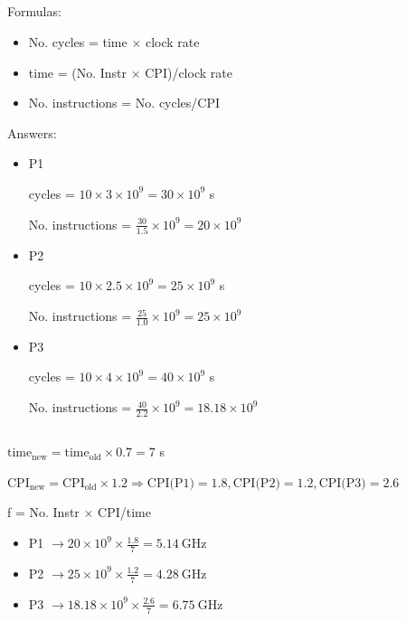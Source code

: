 \documentclass[11pt]{article}
\begin{document}
\subsection{}
\begin{latin}
\indent \indent Formulas:
\begin{itemize}
\item No. cycles = time $\times$ clock rate
\item time = (No. Instr $\times$ CPI)/clock rate \item No. instructions = No. cycles/CPI
\end{itemize}

Answers:
\begin{itemize}
\item P1

cycles = $10 \times 3 \times 10^9 = 30 \times 10^9$ s

No. instructions = $\frac{30}{1.5} \times 10^9 = 20 \times 10^9$

\item P2

cycles = $10 \times 2.5 \times 10^9 = 25 \times 10^9$ s

No. instructions = $\frac{25}{1.0} \times 10^9 = 25 \times 10^9$

\item P3

cycles = $10 \times 4 \times 10^9 = 40 \times 10^9$ s

No. instructions = $\frac{40}{2.2} \times 10^9 = 18.18 \times 10^9$

\end{itemize}
\end{latin}

\subsection{}
\begin{latin}
\indent \indent $\text{time}_{\text{new}} = \text{time}_{\text{old}} \times 0.7 = 7$ s

$\text{CPI}_{\text{new}} = \text{CPI}_{\text{old}} \times 1.2 \Rightarrow \text{CPI(P1)} = 1.8, \text{CPI(P2)} = 1.2, \text{CPI(P3)} = 2.6$

f = No. Instr $\times$ CPI/time

\begin{itemize}
    \item P1 $\rightarrow 20 \times 10^9 \times \frac{1.8}{7} = 5.14 \ \text{GHz}$
    \item P2 $\rightarrow 25 \times 10^9 \times \frac{1.2}{7} = 4.28 \ \text{GHz}$
    \item P3 $\rightarrow 18.18 \times 10^9 \times \frac{2.6}{7} = 6.75 \ \text{GHz}$    
\end{itemize}
\end{latin}
\end{document}
